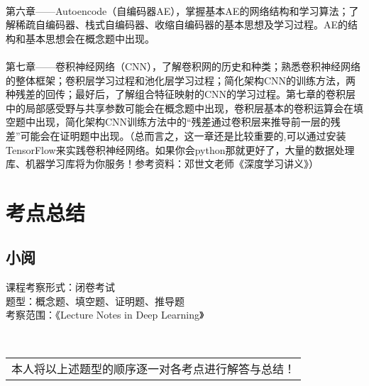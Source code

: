 \documentclass[UFT8]{ctexart}
\begin{document}
~\\
\qquad 第六章——Autoencode（自编码器AE），掌握基本AE的网络结构和学习算法；了解稀疏自编码器、栈式自编码器、收缩自编码器的基本思想及学习过程。AE的结构和基本思想会在概念题中出现。\\
~\\
\qquad 第七章——卷积神经网络（CNN），了解卷积网的历史和种类；熟悉卷积神经网络的整体框架；卷积层学习过程和池化层学习过程；简化架构CNN的训练方法，两种残差的回传；最好后，了解组合特征映射的CNN的学习过程。第七章的卷积层中的局部感受野与共享参数可能会在概念题中出现，卷积层基本的卷积运算会在填空题中出现，简化架构CNN训练方法中的“残差通过卷积层来推导前一层的残差”可能会在证明题中出现。（总而言之，这一章还是比较重要的,可以通过安装TensorFlow来实践卷积神经网络。如果你会python那就更好了，大量的数据处理库、机器学习库将为你服务！参考资料：邓世文老师《深度学习讲义》）
\newpage
\section{考点总结}
\subsection{小阅} 
\begin{flushleft}
课程考察形式：闭卷考试 \\
题型：概念题、填空题、证明题、推导题\\
考察范围：《Lecture Notes in Deep Learning》\\
\end{flushleft}
~\\
\begin{center}
\begin{tabular}{@{} l @{}}
\hline
本人将以上述题型的顺序逐一对各考点进行解答与总结！\\
\end{tabular}
\end{center}
\end{document}
